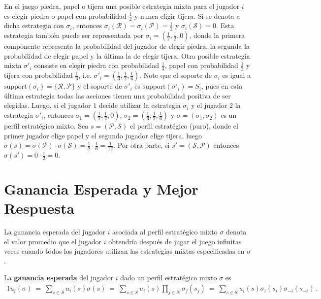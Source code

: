 En el juego piedra, papel o tijera una posible estrategia mixta para el jugador $i$ es elegir piedra o papel con probabilidad $\frac{1}{2}$ y nunca eligir tijera. Si se denota a dicha estrategia con $\sigma_i$, entonces $\sigma_i(\mathcal{R}) = \sigma_i(\mathcal{P}) = \frac{1}{2}$ y $\sigma_i(\mathcal{S}) = 0$. Esta estrategia también puede ser representada por $\sigma_i = (\frac{1}{2}, \frac{1}{2}, 0)$, donde la primera componente representa la probabilidad del jugador de elegir piedra, la segunda la probabilidad de elegir papel y la última la de elegir tijera. Otra posible estrategia mixta $\sigma'_i$ consiste en elegir piedra con probabilidad $\frac{1}{3}$, papel con probabilidad $\frac{1}{2}$ y tijera con probabilidad $\frac{1}{6}$, i.e. $\sigma'_i = \left(\frac{1}{3}, \frac{1}{2}, \frac{1}{6} \right)$. Note que el soporte de $\sigma_i$ es igual a $\text{support}(\sigma_i) = \{\mathcal{R}, \mathcal{P} \}$ y el soporte de $\sigma'_{i}$ es $\text{support}(\sigma'_i) = S_i$, pues en esta última estrategia todas las acciones tienen una probabilidad positiva de ser elegidas. Luego, si el jugador $1$ decide utilizar la estrategia $\sigma_i$ y el jugador $2$ la estrategia $\sigma'_i$, entonces $\sigma_1 = \left( \frac{1}{2}, \frac{1}{2}, 0 \right)$, $\sigma_2 = \left(\frac{1}{3}, \frac{1}{2}, \frac{1}{6}\right)$ y $\sigma = (\sigma_1, \sigma_2)$ es un perfil estratégico mixto. Sea $s = (\mathcal{P}, \mathcal{S})$ el perfil estratégico (puro), donde el primer jugador elige papel y el segundo jugador elige tijera, luego $\sigma(s) = \sigma(\mathcal{P}) \cdot \sigma(\mathcal{S}) = \frac{1}{2} \cdot \frac{1}{6} = \frac{1}{12}$. Por otra parte, si $s' = (\mathcal{S}, \mathcal{P})$ entonces $\sigma(s') = 0 \cdot \frac{1}{2} = 0$.

\section{Ganancia Esperada y Mejor Respuesta}
La ganancia esperada del jugador $i$ asociada al perfil estratégico mixto $\sigma$ denota el valor promedio que el jugador $i$ obtendría después de jugar el juego infinitas veces cuando todos los jugadores utilizan las estrategias mixtas especificadas en $\sigma$. 

\begin{definition}
\label{def:ganancia-esperada}
La \textbf{ganancia esperada} del jugador $i$ dado un perfil estratégico mixto $\sigma$ es
\begin{alignat}{1}
	u_i(\sigma)\ =\ \sum_{s \in S} u_i(s) \sigma(s)\ =\ \sum_{s \in S} u_i(s) \prod _{j \in N} \sigma_j(s_j)\ =\ \sum_{s \in S} u_i(s) \sigma_i(s_i) \sigma_{-i}(s_{-i})\,.
\end{alignat}
\end{definition}

